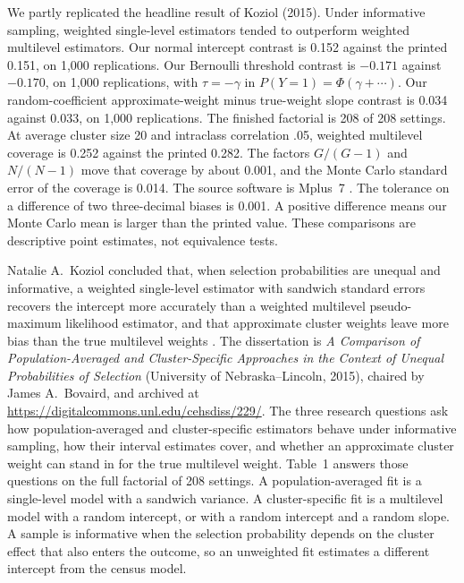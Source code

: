 We partly replicated the headline result of Koziol (2015).
Under informative sampling, weighted single-level estimators tended to
outperform weighted multilevel estimators.
Our normal intercept contrast is 0.152 against the printed 0.151, on 1,000
replications.
Our Bernoulli threshold contrast is $-0.171$ against $-0.170$, on 1,000
replications, with $\tau=-\gamma$ in $P(Y=1)=\Phi(\gamma+\cdots)$.
Our random-coefficient approximate-weight minus true-weight slope contrast is
0.034 against 0.033, on 1,000 replications.
The finished factorial is 208 of 208 settings.
At average cluster size 20 and intraclass correlation .05, weighted multilevel
coverage is 0.252 against the printed 0.282.
The factors $G/(G-1)$ and $N/(N-1)$ move that coverage by about 0.001, and
the Monte Carlo standard error of the coverage is 0.014.
The source software is Mplus~7 \citep{muthen2012}.
The tolerance on a difference of two three-decimal biases is 0.001.
A positive difference means our Monte Carlo mean is larger than the printed
value.
These comparisons are descriptive point estimates, not equivalence tests.

Natalie A.\ Koziol concluded that, when selection probabilities are unequal
and informative, a weighted single-level estimator with sandwich standard
errors recovers the intercept more accurately than a weighted multilevel
pseudo-maximum likelihood estimator, and that approximate cluster weights
leave more bias than the true multilevel weights
\citep{koziol2015}.
The dissertation is \emph{A Comparison of Population-Averaged and
Cluster-Specific Approaches in the Context of Unequal Probabilities of
Selection} (University of Nebraska--Lincoln, 2015), chaired by James A.\
Bovaird, and archived at
\url{https://digitalcommons.unl.edu/cehsdiss/229/}.
The three research questions ask how population-averaged and cluster-specific
estimators behave under informative sampling, how their interval estimates
cover, and whether an approximate cluster weight can stand in for the true
multilevel weight.
Table~1 answers those questions on the full factorial of 208 settings.
A population-averaged fit is a single-level model with a sandwich variance.
A cluster-specific fit is a multilevel model with a random intercept, or with
a random intercept and a random slope.
A sample is informative when the selection probability depends on the cluster
effect that also enters the outcome, so an unweighted fit estimates a
different intercept from the census model.

